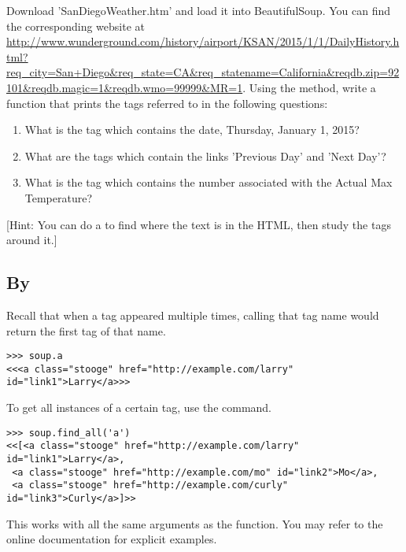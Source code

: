 \begin{problem}
Download 'SanDiegoWeather.htm' and load it into BeautifulSoup.
You can find the corresponding website at \url{http://www.wunderground.com/history/airport/KSAN/2015/1/1/DailyHistory.html?req_city=San+Diego&req_state=CA&req_statename=California&reqdb.zip=92101&reqdb.magic=1&reqdb.wmo=99999&MR=1}. Using the  method, write a function that prints the tags referred to in the following questions:
\begin{enumerate}
\item What is the tag which contains the date, Thursday, January 1, 2015?
\item What are the tags which contain the links 'Previous Day' and 'Next Day'?
\item What is the tag which contains the number associated with the Actual Max Temperature?
\end{enumerate}
[Hint: You can do a  to find where the text is in the HTML, then study the tags around it.]
\end{problem}

\subsection*{By }

Recall that when a tag appeared multiple times, calling that tag name would return the first tag of that name.
\begin{lstlisting}
>>> soup.a
<<<a class="stooge" href="http://example.com/larry" id="link1">Larry</a>>>
\end{lstlisting}

To get all instances of a certain tag, use the  command.
\begin{lstlisting}
>>> soup.find_all('a')
<<[<a class="stooge" href="http://example.com/larry" id="link1">Larry</a>,
 <a class="stooge" href="http://example.com/mo" id="link2">Mo</a>,
 <a class="stooge" href="http://example.com/curly" id="link3">Curly</a>]>>
\end{lstlisting}

This works with all the same arguments as the  function.
You may refer to the online documentation for explicit examples.

